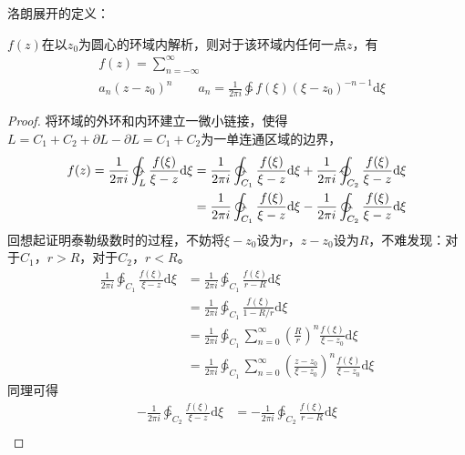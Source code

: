 \documentclass[12pt, a4paper, oneside]{ctexart}
\def\D{\mathrm{d}}
\newcommand{\F}[1][z]
{\ensuremath{f(#1)}}
\begin{document}
洛朗展开的定义：

$\F$在以$z_0$为圆心的环域内解析，则对于该环域内任何一点$z$，有
\begin{align*}
     & \F = \sum_{n=-\infty}^\infty                                                                 \\
     & a_n (z-z_0)^n\quad\quad a_n=\frac{1}{2\pi i} \ointctrclockwise \F[\xi](\xi-z_0)^{-n-1}\D \xi
\end{align*}
\begin{proof}
    将环域的外环和内环建立一微小链接，使得$L=C_1+C_2+\partial L - \partial L = C_1+C_2$为一单连通区域的边界，
    \begin{align*}
        \F = \frac{1}{2\pi i} \ointctrclockwise_L \frac{\F[\xi]}{\xi-z}\D \xi=\frac{1}{2\pi i} \ointctrclockwise_{C_1} \frac{\F[\xi]}{\xi-z}\D \xi+\frac{1}{2\pi i} \ointclockwise_{C_2} \frac{\F[\xi]}{\xi-z}\D \xi \\
        = \frac{1}{2\pi i} \ointctrclockwise_{C_1} \frac{\F[\xi]}{\xi-z}\D \xi -\frac{1}{2\pi i} \ointctrclockwise_{C_2} \frac{\F[\xi]}{\xi-z}\D \xi                                                                 \\
    \end{align*}
    回想起证明泰勒级数时的过程，不妨将$\xi-z_0$设为$r$，$z-z_0$设为$R$，不难发现：对于$C_1$，$r>R$，对于$C_2$，$r<R$。
    \begin{align*}
        \frac{1}{2\pi i} \ointctrclockwise_{C_1} \frac{\F[\xi]}{\xi-z}\D \xi
         & = \frac{1}{2\pi i} \ointctrclockwise_{C_1} \frac{\F[\xi]}{r-R}\D \xi                                                              \\
         & = \frac{1}{2\pi i} \ointctrclockwise_{C_1} \frac{\F[\xi]}{1-R/r}\D \xi                                                            \\
         & =\frac{1}{2\pi i} \ointctrclockwise_{C_1} \sum_{n=0}^\infty \left(\frac{R}{r}\right)^n  \frac{\F[\xi]}{\xi-z_0} \D \xi            \\
         & =\frac{1}{2\pi i} \ointctrclockwise_{C_1} \sum_{n=0}^\infty  \left(\frac{z-z_0}{\xi-z_0}\right)^n  \frac{\F[\xi]}{\xi-z_0} \D \xi
    \end{align*}
    同理可得
    \begin{align*}
        -\frac{1}{2\pi i} \ointctrclockwise_{C_2} \frac{\F[\xi]}{\xi-z}\D \xi
         & = -\frac{1}{2\pi i} \ointctrclockwise_{C_2} \frac{\F[\xi]}{r-R}\D \xi                                                           \\

\end{align*}
\end{proof}
\end{document}

